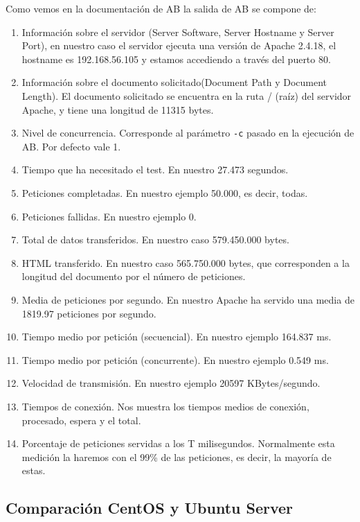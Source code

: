 \documentclass[12pt, spanish]{article}
\begin{document}
Como vemos en la documentación de AB\cite{salida_ab} la salida de AB se compone de:

\begin{enumerate}
	\item Información sobre el servidor (Server Software, Server Hostname y Server Port), en nuestro caso el servidor ejecuta una versión de Apache 2.4.18, el hostname es 192.168.56.105 y estamos accediendo a través del puerto 80.
	\item Información sobre el documento solicitado(Document Path y Document Length). El documento solicitado se encuentra en la ruta / (raíz) del servidor Apache, y tiene una longitud de 11315 bytes.
	\item Nivel de concurrencia. Corresponde al parámetro \texttt{-c} pasado en la ejecución de AB. Por defecto vale 1.
	\item Tiempo que ha necesitado el test. En nuestro 27.473 segundos.
	\item Peticiones completadas. En nuestro ejemplo 50.000, es decir, todas.
	\item Peticiones fallidas. En nuestro ejemplo 0.
	\item Total de datos transferidos. En nuestro caso 579.450.000 bytes.
	\item HTML transferido. En nuestro caso 565.750.000 bytes, que corresponden a la longitud del documento por el número de peticiones.
	\item Media de peticiones por segundo. En nuestro Apache ha servido una media de 1819.97 peticiones por segundo.
	\item Tiempo medio por petición (secuencial). En nuestro ejemplo 164.837 ms.
	\item Tiempo medio por petición (concurrente). En nuestro ejemplo 0.549 ms.
	\item Velocidad de transmisión. En nuestro ejemplo 20597 KBytes/segundo.
	\item Tiempos de conexión. Nos muestra los tiempos medios de conexión, procesado, espera y el total.
	\item Porcentaje de peticiones servidas a los T milisegundos. Normalmente esta medición la haremos con el 99\% de las peticiones, es decir, la mayoría de estas.
\end{enumerate}


\newpage

\subsection{Comparación CentOS y Ubuntu Server}
\end{document}
